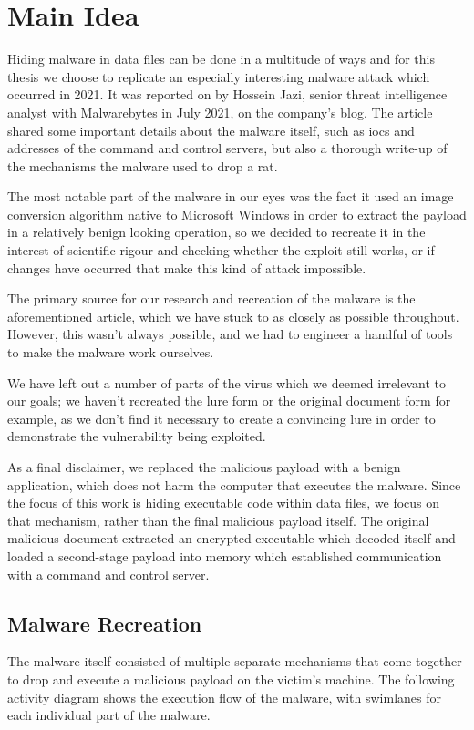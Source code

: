 \chapter{Main Idea}
Hiding malware in data files can be done in a multitude of ways and for this thesis we choose to replicate an especially
interesting malware attack which occurred in 2021. It was reported on by Hossein Jazi, senior threat intelligence
analyst with Malwarebytes in July 2021, on the company's blog. The article shared some important details about the malware 
itself, such as \acrfull{iocs} and addresses of the command and control servers, but also a thorough write-up of the mechanisms 
the malware used to drop a \acrfull{rat}.

The most notable part of the malware in our eyes was the fact it used an image conversion algorithm native to Microsoft
Windows in order to extract the payload in a relatively benign looking operation, so we decided to recreate it 
in the interest of scientific rigour and checking whether the exploit still works, or if changes have occurred
that make this kind of attack impossible.

The primary source for our research and recreation of the malware is the aforementioned article, which we have stuck to
as closely as possible throughout. However, this wasn't always possible, and we had to engineer a handful of tools
to make the malware work ourselves. 

We have left out a number of parts of the virus which we deemed irrelevant to our goals; we haven't recreated the lure
form or the original document form for example, as we don't find it necessary to create a convincing lure in order to
demonstrate the vulnerability being exploited.

As a final disclaimer, we replaced the malicious payload with a benign application, which does not harm the computer
that executes the malware. Since the focus of this work is hiding executable code within data files, we focus on
that mechanism, rather than the final malicious payload itself. The original malicious document extracted an encrypted
executable which decoded itself and loaded a second-stage payload into memory which established communication with a
command and control server.

\section{Malware Recreation}
The malware itself consisted of multiple separate mechanisms that come together to drop and execute a malicious payload
on the victim's machine. The following activity diagram shows the execution flow of the malware, 
with swimlanes for each individual part of the malware.

